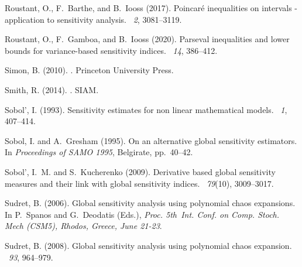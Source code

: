 \documentclass[a4paper,11pt]{article}
\theoremstyle{definition}
\theoremstyle{remark}
\theoremstyle{theorem}
\begin{document}
\begin{thebibliography}{}
	Roustant, O., F.~Barthe, and B.~Iooss (2017).
	\newblock Poincar\'e inequalities on intervals - application to sensitivity
	analysis.
	~{\em 2}, 3081--3119.
	
	Roustant, O., F.~Gamboa, and B.~Iooss (2020).
	\newblock Parseval inequalities and lower bounds for variance-based sensitivity
	indices.
	~{\em 14}, 386--412.
	
	Simon, B. (2010).
	.
	\newblock Princeton University Press.
	
	Smith, R. (2014).
	.
	\newblock SIAM.
	
	Sobol', I. (1993).
	\newblock Sensitivity estimates for non linear mathematical models.
	~{\em 1},
	407--414.
	
	Sobol, I. and A.~Gresham (1995).
	\newblock On an alternative global sensitivity estimators.
	\newblock In {\em Proceedings of SAMO 1995}, Belgirate, pp.\  40--42.
	
	Sobol', I.~M. and S.~Kucherenko (2009).
	\newblock Derivative based global sensitivity measures and their link with
	global sensitivity indices.
	~{\em 79\/}(10), 3009--3017.
	
	Sudret, B. (2006).
	\newblock Global sensitivity analysis using polynomial chaos expansions.
	\newblock In P.~Spanos and G.~Deodatis (Eds.), {\em Proc. 5th~Int. Conf. on
		Comp. Stoch. Mech (CSM5), Rhodos, Greece, June 21-23}.
	
	Sudret, B. (2008).
	\newblock Global sensitivity analysis using polynomial chaos expansion.
	~{\em 93}, 964--979.
	

\end{thebibliography}
\end{document}
